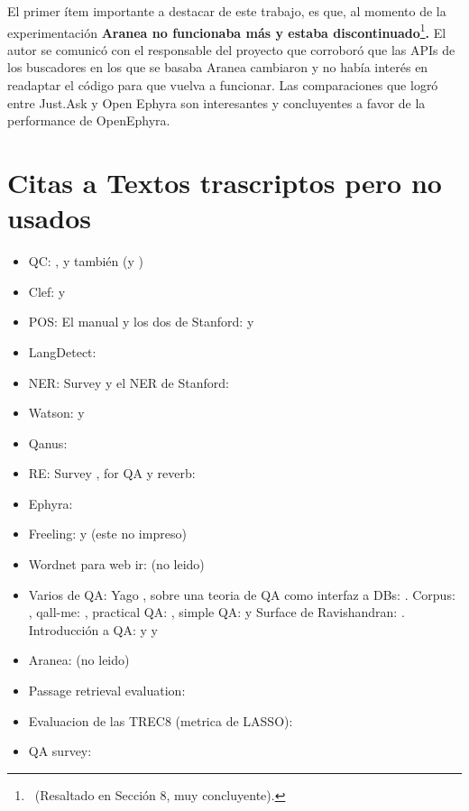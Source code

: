 El primer ítem importante a destacar de este trabajo, es que, al
momento de la experimentación \textbf{Aranea no funcionaba más y
estaba discontinuado}\footnote{\ (Resaltado en Sección 8, muy
concluyente).\par }\textbf{. }El autor se comunicó con el responsable
del proyecto que corroboró que las APIs de los buscadores en los que
se basaba Aranea cambiaron y no había interés en readaptar el
código para que vuelva a funcionar. Las comparaciones que logró
entre Just.Ask y Open Ephyra son interesantes y concluyentes a favor de
la performance de OpenEphyra. 


\section{Citas a Textos trascriptos pero no usados}
\begin{itemize}
\item QC: \cite{QC1}, \cite{QC2} y también \cite{QC3} (y \cite{QC-other})
\item Clef: \cite{GuidelineClef07} y \cite{OverviewClef07} 
\item POS: El manual \cite{POS0} y los dos de Stanford: \cite{POS1} y \cite{POS2}
\item LangDetect: \cite{nakatani2010langdetect}
\item NER: Survey \cite{NER1} y el NER de Stanford: \cite{NER2}
\item Watson: \cite{WATSON1} y \cite{WATSON2}
\item Qanus: \cite{QANUS1}
\item RE: Survey \cite{RE1}, for QA \cite{RE2} y reverb: \cite{RE3}
\item Ephyra: \cite{EPHYRA1}
\item Freeling: \cite{FREELING1} y \cite{FREELING2} (este no impreso)
\item Wordnet para web ir: \cite{WN1} (no leido)
\item Varios de QA: Yago \cite{YAGO-QA1}, sobre una teoria de QA como interfaz a DBs: \cite{QADB1}. Corpus: \cite{TRAIN-QA1}, qall-me: \cite{QALL-ME1}, practical QA: \cite{QAS1}, simple QA: \cite{QAS2} y Surface de Ravishandran: \cite{SURF1}. Introducción a QA: \cite{QA1} y \cite{QA2} y \cite{QA3}
\item Aranea: \cite{ARANEA1} (no leido)
\item Passage retrieval evaluation: \cite{PASSAGE1}
\item Evaluacion de las TREC8 (metrica de \cite{QA3} LASSO): \cite{TREC8}
\item QA survey: \cite{QA-survey}
\end{itemize}



